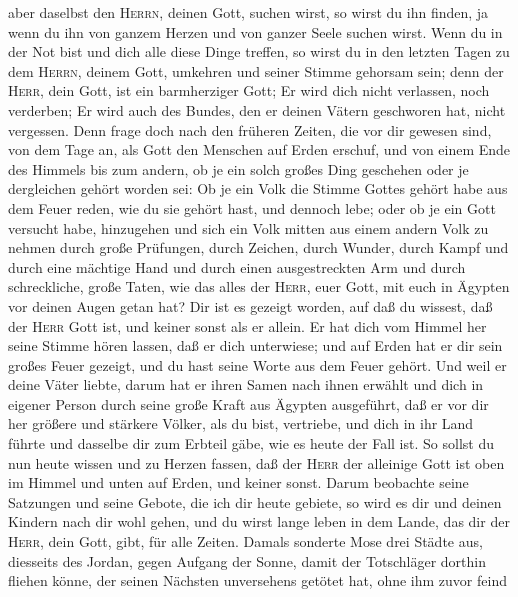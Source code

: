 aber daselbst den \textsc{Herrn}, deinen Gott, suchen wirst, so wirst du
ihn finden, ja wenn du ihn von ganzem Herzen und von ganzer Seele suchen
wirst.  Wenn du in der Not bist und dich alle diese Dinge
treffen, so wirst du in den letzten Tagen zu dem \textsc{Herrn}, deinem
Gott, umkehren und seiner Stimme gehorsam sein;  denn der
\textsc{Herr}, dein Gott, ist ein barmherziger Gott; Er wird dich nicht
verlassen, noch verderben; Er wird auch des Bundes, den er deinen Vätern
geschworen hat, nicht vergessen.  Denn frage doch nach
den früheren Zeiten, die vor dir gewesen sind, von dem Tage an, als Gott
den Menschen auf Erden erschuf, und von einem Ende des Himmels bis zum
andern, ob je ein solch großes Ding geschehen oder je dergleichen gehört
worden sei:  Ob je ein Volk die Stimme Gottes gehört habe
aus dem Feuer reden, wie du sie gehört hast, und dennoch lebe;
 oder ob je ein Gott versucht habe, hinzugehen und sich
ein Volk mitten aus einem andern Volk zu nehmen durch große Prüfungen,
durch Zeichen, durch Wunder, durch Kampf und durch eine mächtige Hand
und durch einen ausgestreckten Arm und durch schreckliche, große Taten,
wie das alles der \textsc{Herr}, euer Gott, mit euch in Ägypten vor
deinen Augen getan hat?  Dir ist es gezeigt worden, auf
daß du wissest, daß der \textsc{Herr} Gott ist, und keiner sonst als er
allein.  Er hat dich vom Himmel her seine Stimme hören
lassen, daß er dich unterwiese; und auf Erden hat er dir sein großes
Feuer gezeigt, und du hast seine Worte aus dem Feuer gehört.
 Und weil er deine Väter liebte, darum hat er ihren Samen
nach ihnen erwählt und dich in eigener Person durch seine große Kraft
aus Ägypten ausgeführt,  daß er vor dir her größere und
stärkere Völker, als du bist, vertriebe, und dich in ihr Land führte und
dasselbe dir zum Erbteil gäbe, wie es heute der Fall ist.
 So sollst du nun heute wissen und zu Herzen fassen, daß
der \textsc{Herr} der alleinige Gott ist oben im Himmel und unten auf
Erden, und keiner sonst.  Darum beobachte seine Satzungen
und seine Gebote, die ich dir heute gebiete, so wird es dir und deinen
Kindern nach dir wohl gehen, und du wirst lange leben in dem Lande, das
dir der \textsc{Herr}, dein Gott, gibt, für alle Zeiten. 
Damals sonderte Mose drei Städte aus, diesseits des Jordan, gegen
Aufgang der Sonne,  damit der Totschläger dorthin fliehen
könne, der seinen Nächsten unversehens getötet hat, ohne ihm zuvor feind
